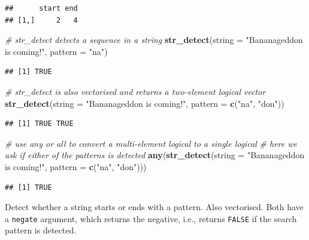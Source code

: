 \documentclass[]{book}
\newenvironment{Shaded}{}{}
\newcommand{\CommentTok}[1]{\textcolor[rgb]{0.38,0.63,0.69}{\textit{#1}}}
\newcommand{\DataTypeTok}[1]{\textcolor[rgb]{0.56,0.13,0.00}{#1}}
\newcommand{\KeywordTok}[1]{\textcolor[rgb]{0.00,0.44,0.13}{\textbf{#1}}}
\newcommand{\NormalTok}[1]{#1}
\newcommand{\StringTok}[1]{\textcolor[rgb]{0.25,0.44,0.63}{#1}}
\begin{document}
\begin{verbatim}
##      start end
## [1,]     2   4
\end{verbatim}

\begin{Shaded}
\begin{Highlighting}[]
\CommentTok{# str_detect detects a sequence in a string}
\KeywordTok{str_detect}\NormalTok{(}\DataTypeTok{string =} \StringTok{"Bananageddon is coming!"}\NormalTok{,}
           \DataTypeTok{pattern =} \StringTok{"na"}\NormalTok{)}
\end{Highlighting}
\end{Shaded}

\begin{verbatim}
## [1] TRUE
\end{verbatim}

\begin{Shaded}
\begin{Highlighting}[]
\CommentTok{# str_detect is also vectorised and returns a two-element logical vector}
\KeywordTok{str_detect}\NormalTok{(}\DataTypeTok{string =} \StringTok{"Bananageddon is coming!"}\NormalTok{,}
           \DataTypeTok{pattern =} \KeywordTok{c}\NormalTok{(}\StringTok{"na"}\NormalTok{, }\StringTok{"don"}\NormalTok{))}
\end{Highlighting}
\end{Shaded}

\begin{verbatim}
## [1] TRUE TRUE
\end{verbatim}

\begin{Shaded}
\begin{Highlighting}[]
\CommentTok{# use any or all to convert a multi-element logical to a single logical}
\CommentTok{# here we ask if either of the patterns is detected}
\KeywordTok{any}\NormalTok{(}\KeywordTok{str_detect}\NormalTok{(}\DataTypeTok{string =} \StringTok{"Bananageddon is coming!"}\NormalTok{,}
               \DataTypeTok{pattern =} \KeywordTok{c}\NormalTok{(}\StringTok{"na"}\NormalTok{, }\StringTok{"don"}\NormalTok{)))}
\end{Highlighting}
\end{Shaded}

\begin{verbatim}
## [1] TRUE
\end{verbatim}

Detect whether a string starts or ends with a pattern. Also vectorised.
Both have a \texttt{negate} argument, which returns the negative, i.e., returns \texttt{FALSE} if the search pattern is detected.
\end{document}
